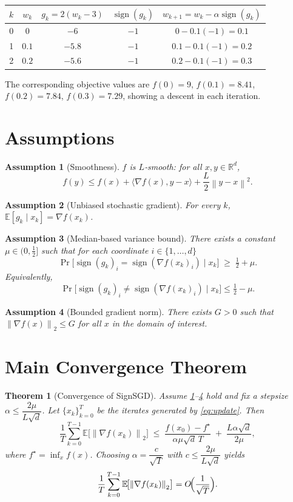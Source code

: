 \documentclass{article}
\newtheorem{theorem}{Theorem}
\newtheorem{assumption}{Assumption}
\newcommand{\sign}{\operatorname{sign}}
\newcommand{\E}{\mathbb{E}}
\newcommand{\R}{\mathbb{R}}
\newcommand{\norm}[1]{\left\lVert#1\right\rVert}
\newcommand{\ip}[2]{\langle #1,#2\rangle}
\begin{document}
\begin{center}
\begin{tabular}{c|c|c|c|c}
$k$ & $w_k$ & $g_k=2(w_k-3)$ & $\sign(g_k)$ & $w_{k+1}=w_k-\alpha\sign(g_k)$\\ \hline
0 & $0$   & $-6$ & $-1$ & $0-0.1(-1)=0.1$\\[2mm]
1 & $0.1$ & $-5.8$ & $-1$ & $0.1-0.1(-1)=0.2$\\[2mm]
2 & $0.2$ & $-5.6$ & $-1$ & $0.2-0.1(-1)=0.3$\\[2mm]
\end{tabular}
\end{center}
The corresponding objective values are $f(0)=9$, $f(0.1)=8.41$, $f(0.2)=7.84$, $f(0.3)=7.29$,
showing a descent in each iteration.

\newpage
\section*{Assumptions}
\label{sec:ass}
\begin{assumption}[Smoothness]\label{ass:smooth}
$f$ is $L$‑smooth: for all $x,y\in\R^{d}$,
\[
f(y)\le f(x)+\ip{\nabla f(x)}{y-x}+\frac{L}{2}\norm{y-x}^2 .
\]
\end{assumption}
\begin{assumption}[Unbiased stochastic gradient]\label{ass:unbiased}
For every $k$, $\E[g_k\mid x_k]=\nabla f(x_k)$.
\end{assumption}
\begin{assumption}[Median‑based variance bound]\label{ass:median}
There exists a constant $\mu\in\bigl(0,\tfrac12\bigr]$ such that for each coordinate $i\in\{1,\dots,d\}$
\[
\Pr\bigl[\sign(g_k)_i=\sign(\nabla f(x_k)_i)\mid x_k\bigr]\;\ge\;\tfrac12+\mu .
\tag{A3}
\]
Equivalently,
\[
\Pr\bigl[\sign(g_k)_i\neq\sign(\nabla f(x_k)_i)\mid x_k\bigr]\le\tfrac12-\mu .
\]
\end{assumption}
\begin{assumption}[Bounded gradient norm]\label{ass:bounded}
There exists $G>0$ such that $\norm{\nabla f(x)}_2\le G$ for all $x$ in the domain of interest.
\end{assumption}

\section*{Main Convergence Theorem}
\begin{theorem}[Convergence of SignSGD]\label{thm:main}
Assume \ref{ass:smooth}–\ref{ass:bounded} hold and fix a stepsize $\alpha\le \dfrac{2\mu}{L\sqrt{d}}$.
Let $\{x_k\}_{k=0}^T$ be the iterates generated by \eqref{eq:update}.
Then
\[
\frac{1}{T}\sum_{k=0}^{T-1}\E\!\bigl[\norm{\nabla f(x_k)}_2\bigr]
\;\le\;
\frac{f(x_0)-f^\star}{\alpha\mu\sqrt{d}\,T}
\;+\;
\frac{L\alpha\sqrt{d}}{2\mu},
\tag{1}
\]
where $f^\star=\inf_{x}f(x)$.  
Choosing $\alpha = \dfrac{c}{\sqrt{T}}$ with $c\le \dfrac{2\mu}{L\sqrt{d}}$ yields
\[
\frac{1}{T}\sum_{k=0}^{T-1}\E\!\bigl[\norm{\nabla f(x_k)}_2\bigr]
= O\!\Bigl(\frac{1}{\sqrt{T}}\Bigr).
\]
\end{theorem}
\end{document}
